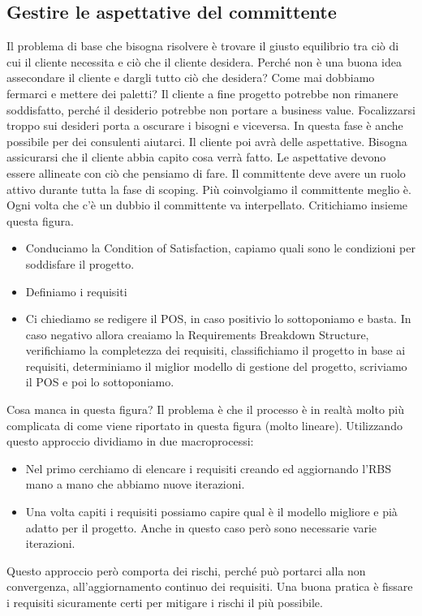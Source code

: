 \subsection{Gestire le aspettative del committente}
Il problema di base che bisogna risolvere è trovare il giusto equilibrio tra ciò di cui il cliente necessita e ciò che il cliente desidera. Perché non è una buona idea assecondare il cliente e dargli tutto ciò che desidera? Come mai dobbiamo fermarci e mettere dei paletti?\newline
Il cliente a fine progetto potrebbe non rimanere soddisfatto, perché il desiderio potrebbe non portare a business value. Focalizzarsi troppo sui desideri porta a oscurare i bisogni e viceversa. In questa fase è anche possibile per dei consulenti aiutarci. Il cliente poi avrà delle aspettative. Bisogna assicurarsi che il cliente abbia capito cosa verrà fatto. Le aspettative devono essere allineate con ciò che pensiamo di fare. Il committente deve avere un ruolo attivo durante tutta la fase di scoping. Più coinvolgiamo il committente meglio è. Ogni volta che c'è un dubbio il committente va interpellato.
Critichiamo insieme questa figura.
\begin{itemize}
	\item Conduciamo la Condition of Satisfaction, capiamo quali sono le condizioni per soddisfare il progetto.
	\item Definiamo i requisiti
	\item Ci chiediamo se redigere il POS, in caso positivio lo sottoponiamo e basta. In caso negativo allora creaiamo la Requirements Breakdown Structure, verifichiamo la completezza dei requisiti, classifichiamo il progetto in base ai requisiti, determiniamo il miglior modello di gestione del progetto, scriviamo il POS e poi lo sottoponiamo.
\end{itemize}
Cosa manca in questa figura? Il problema è che il processo è in realtà molto più complicata di come viene riportato in questa figura (molto lineare).
Utilizzando questo approccio dividiamo in due macroprocessi:
\begin{itemize}
	\item Nel primo cerchiamo di elencare i requisiti creando ed aggiornando l'RBS mano a mano che abbiamo nuove iterazioni.
	\item Una volta capiti i requisiti possiamo capire qual è il modello migliore e pià adatto per il progetto. Anche in questo caso però sono necessarie varie iterazioni.
\end{itemize}
Questo approccio però comporta dei rischi, perché può portarci alla non convergenza, all'aggiornamento continuo dei requisiti. Una buona pratica è fissare i requisiti sicuramente certi per mitigare i rischi il più possibile.
